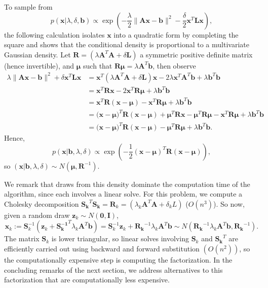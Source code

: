 \documentclass{article}
\newcommand{\vect}[1]{\boldsymbol{#1}}
\begin{document}
To sample from 
$$
  p(\vect x | \lambda,\delta,\vect b) \propto \exp\left(-\frac{\lambda}{2}\|\vect{Ax} - \vect b\|^2 - \frac{\delta}{2}\vect x^T \vect L \vect x\right),
$$
the following calculation isolates $\vect x$ into a quadratic form by completing the square and shows that the conditional density is proportional to a multivariate Gaussian density. 
Let $\vect R = (\lambda \vect A^T\vect A + \delta \vect L)$ a symmetric positive definite matrix (hence invertible), and $\vect \mu$ such that $\vect R\vect \mu = \lambda \vect A^T\vect b$, then observe
\begin{align}
  \lambda\|\vect{Ax} - \vect b\|^2 + \delta\vect x^T \vect L \vect x
  &= \vect x^T( \lambda \vect A^T \vect A + \delta \vect L)\vect x - 2 \lambda \vect x^T \vect A^T \vect b + \lambda \vect b^T \vect b\nonumber \\
  &= \vect x^T\vect R\vect x - 2 \vect x^T \vect R\vect \mu + \lambda \vect b^T \vect b\nonumber \\
  &= \vect x^T\vect R(\vect x - \vect \mu) - \vect x^T \vect R\vect \mu + \lambda \vect b^T \vect b\nonumber \\
  &= \vect (\vect x-\vect \mu)^T\vect R(\vect x - \vect \mu) + \vect \mu^T\vect R\vect x - \vect \mu^T\vect R\vect \mu - \vect x^T \vect R\vect \mu + \lambda \vect b^T \vect b\nonumber \\
  &= \vect (\vect x-\vect \mu)^T\vect R(\vect x - \vect \mu) - \vect \mu^T\vect R\vect \mu + \lambda \vect b^T \vect b. \label{factored_form}
\end{align}
Hence, 
$$
  p(\vect x|\vect b,\lambda,\delta) \propto \exp\left(-\frac12 (\vect x - \vect \mu)^T\vect R(\vect x - \vect \mu)\right),
$$ 
so $(\vect x|\vect b,\lambda,\delta) \sim N( \vect \mu, \vect R^{-1})$.

We remark that draws from this density dominate the computation time of the algorithm, since each involves a linear solve.  
For this problem, we compute a Cholesky decomposition $\vect {S_k}^T\vect{S_k} = \vect R_k = (\lambda_k \vect A^T\vect A + \delta_k L)$ ($O(n^3)$).
So now, given a random draw $\vect z_k \sim N(\vect 0, \vect I)$, 
$$
  \vect x_k := \vect S_k^{-1}(\vect z_k + \vect {S_k^{-1}}^T \lambda_k\vect A^T \vect b) = \vect S_k^{-1} \vect z_k + \vect {R_k}^{-1} \lambda_k\vect A^T \vect b \sim N(\vect {R_k}^{-1} \lambda_k\vect A^T \vect b,\vect {R_k}^{-1}). 
$$
The matrix $\vect S_k$ is lower triangular, so linear solves involving $\vect S_k$ and $\vect {S_k}^T$ are efficiently carried out using backward and forward substitution $(O(n^2))$, so the computationally expensive step is computing the factorization.  In the concluding remarks of the next section, we address alternatives to this factorization that are computationally less expensive.
\end{document}
